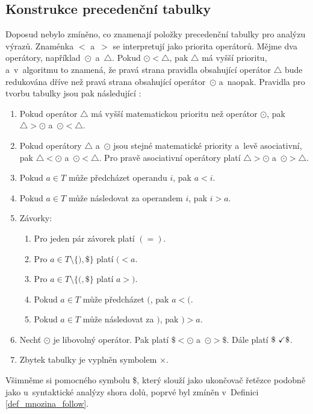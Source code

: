 \subsection*{Konstrukce precedenční tabulky}
Doposud nebylo zmíněno, co znamenají položky precedenční tabulky pro analýzu výrazů.
Znaménka $<$ a~$>$ se interpretují jako priorita operátorů.
Mějme dva operátory, například~$\odot$~a~$\bigtriangleup$.
Pokud $\odot < \bigtriangleup$, pak $\bigtriangleup$ má vyšší prioritu, a~v~algoritmu to znamená, že pravá strana pravidla obsahující operátor $\bigtriangleup$ bude redukována dříve než pravá strana obsahující operátor~$\odot$ a~naopak.
Pravidla pro tvorbu tabulky jsou pak následující \cite{medunaElementsOfCompDesign,meduna2017sa-zdola-nahoru}:
\begin{enumerate}
    \item Pokud operátor $\bigtriangleup$ má vyšší matematickou prioritu než operátor $\odot$, pak $\bigtriangleup > \odot$ a~$\odot < \bigtriangleup$.
    \item Pokud operátory $\bigtriangleup$ a~$\odot$ jsou stejné matematické priority a~levě asociativní, pak $\bigtriangleup < \odot$ a~$\odot < \bigtriangleup$.
    Pro pravě asociativní operátory platí $\bigtriangleup > \odot$ a~$\odot > \bigtriangleup$.
    \item Pokud $a \in T$ může předcházet operandu $i$, pak $a < i$.
    \item Pokud $a \in T$ může následovat za operandem $i$, pak $i > a$.
    \item Závorky:
    \begin{enumerate}
        \item Pro jeden pár závorek platí $(=)$.
        \item Pro $a \in T \setminus \{) ,\$\}$ platí $( < a$.
        \item Pro $a \in T \setminus\{(, \$\}$ platí $a > )$.
        \item Pokud $a \in T$ může předcházet $($, pak $a < ($. 
        \item Pokud $a \in T$ může následovat za $)$, pak $) > a$.
    \end{enumerate}
    \item Nechť $\odot$ je libovolný operátor.
    Pak platí $\$ < \odot$ a~$\odot > \$$.
    Dále platí $\$ \text{ \checkmark } \$$.
    \item Zbytek tabulky je vyplněn symbolem $\times$.
\end{enumerate}
Všimněme si pomocného symbolu \$, který slouží jako ukončovač řetězce podobně jako u~syntaktické analýzy shora dolů, poprvé byl zmíněn v~Definici \ref{def_mnozina_follow}.

